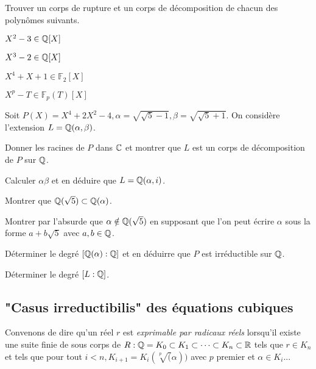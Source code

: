 \documentclass[french]{report}
\begin{document}
\begin{exo}
    Trouver un corps de rupture et un corps de décomposition de chacun des polynômes suivants.
    \begin{q}{1}
        \(X^2-3\in\mathbb{Q}[X]\)
    \end{q}
    \begin{q}{2}
        \(X^3-2\in\mathbb{Q}[X]\)
    \end{q}
    \begin{q}{3}
        \(X^4+X+1\in\mathbb{F}_2[X]\)
    \end{q}
    \begin{q}{4}
        \(X^p-T\in\mathbb{F}_p(T)[X]\)
    \end{q}
\end{exo}

\begin{exo}
    Soit \(P(X)=X^4+2X^2-4, \alpha=\sqrt{\sqrt{5}-1}, \beta=\sqrt{\sqrt{5}+1}\).
    On considère l'extension \(L=\mathbb{Q}(\alpha,\beta)\).
    \begin{q}{1}
        Donner les racines de \(P\) dans \(\mathbb{C}\) et montrer que \(L\) est un corps
        de décomposition de \(P\) sur \(\mathbb{Q}\).
    \end{q}
    \begin{q}{2}
        Calculer \(\alpha\beta\) et en déduire que \(L=\mathbb{Q}(\alpha, i)\).
    \end{q}
    \begin{q}{3}
        Montrer que \(\mathbb{Q}(\sqrt{5})\subset\mathbb{Q}(\alpha)\).
    \end{q}
    \begin{q}{4}
        Montrer par l'absurde que \(\alpha\notin\mathbb{Q}(\sqrt{5})\) en supposant que l'on
        peut écrire \(\alpha\) sous la forme \(a+b\sqrt{5}\) avec \(a,b\in\mathbb{Q}\).
    \end{q}
    \begin{q}{5}
        Déterminer le degré \([\mathbb{Q}(\alpha):\mathbb{Q}]\) et en déduirre que \(P\) est irréductible
        sur \(\mathbb{Q}\).
    \end{q}
    \begin{q}{6}
        Déterminer le degré \([L:\mathbb{Q}]\).
    \end{q}
\end{exo}

\subsection*{"Casus irreductibilis" des équations cubiques}
\begin{exo}
    Convenons de dire qu'un réel \(r\) est \textit{exprimable par radicaux réels} lorsqu'il
    existe une suite finie de sous corps de \(R:\mathbb{Q}=K_0\subset K_1\subset\dots \subset K_n
    \subset \mathbb{R}\) tels que \(r\in K_n\) et tels que pour tout \(i<n, K_{i+1}=K_i(\sqrt[p](\alpha))\)
    avec \(p\) premier et \(\alpha\in K_i\)...
\end{exo}
\end{document}
